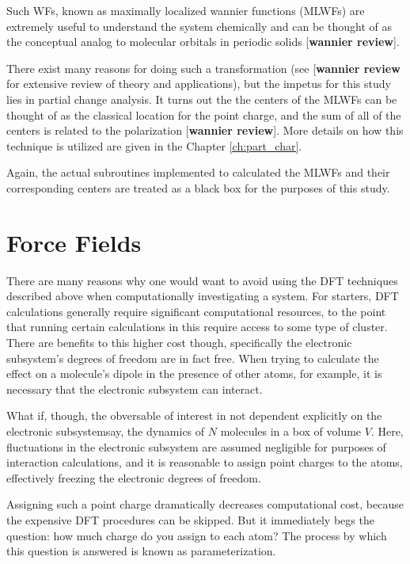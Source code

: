 \noindent Such WFs, known as maximally localized wannier functions (MLWFs) are extremely useful to understand the system chemically and can be thought of as the conceptual analog to molecular orbitals in periodic solids [\textbf{wannier review}].


There exist many reasons for doing such a transformation (see [\textbf{wannier review} for extensive review of theory and applications), but the impetus for this study lies in partial change analysis. It turns out the the centers of the MLWFs can be thought of as the classical location for the point charge, and the sum of all of the centers is related to the polarization [\textbf{wannier review}]. More details on how this technique is utilized are given in the Chapter \ref{ch:part_char}.

Again, the actual subroutines implemented to calculated the MLWFs and their corresponding centers are treated as a black box for the purposes of this study.

\section{Force Fields}

There are many reasons why one would want to avoid using the DFT techniques described above when computationally investigating a system. For starters, DFT calculations generally require significant computational resources, to the point that running certain calculations in this require access to some type of cluster. There are benefits to this higher cost though, specifically the electronic subsystem's degrees of freedom are in fact free. When trying to calculate the effect on a molecule's dipole in the presence of other atoms, for example, it is necessary that the electronic subsystem can interact.

What if, though, the obversable of interest in not dependent explicitly on the electronic subsystem\textemdash say, the dynamics of $N$ molecules in a box of volume $V$. Here, fluctuations in the electronic subsystem are assumed negligible for purposes of interaction calculations, and it is reasonable to assign point charges to the atoms, effectively freezing the electronic degrees of freedom. 

Assigning such a point charge dramatically decreases computational cost, because the expensive DFT procedures can be skipped. But it immediately begs the question: how much charge do you assign to each atom? The process by which this question is answered is known as parameterization.

